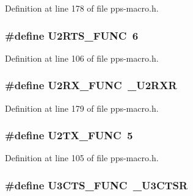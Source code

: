 Definition at line 178 of file pps-\/macro.\+h.

\hypertarget{pps-macro_8h_ad38ab81c0344617b73a0e7da86bec66b}{}
\subsubsection[{U2\+R\+T\+S\+\_\+\+F\+U\+N\+C}]{\setlength{\rightskip}{0pt plus 5cm}\#define U2\+R\+T\+S\+\_\+\+F\+U\+N\+C~6}\label{pps-macro_8h_ad38ab81c0344617b73a0e7da86bec66b}


Definition at line 106 of file pps-\/macro.\+h.

\hypertarget{pps-macro_8h_adcda8db9522945bb7767efa2d742e797}{}
\subsubsection[{U2\+R\+X\+\_\+\+F\+U\+N\+C}]{\setlength{\rightskip}{0pt plus 5cm}\#define U2\+R\+X\+\_\+\+F\+U\+N\+C~\+\_\+\+U2\+R\+X\+R}\label{pps-macro_8h_adcda8db9522945bb7767efa2d742e797}


Definition at line 179 of file pps-\/macro.\+h.

\hypertarget{pps-macro_8h_aedfc30fea10a244d35e993a18270aae5}{}
\subsubsection[{U2\+T\+X\+\_\+\+F\+U\+N\+C}]{\setlength{\rightskip}{0pt plus 5cm}\#define U2\+T\+X\+\_\+\+F\+U\+N\+C~5}\label{pps-macro_8h_aedfc30fea10a244d35e993a18270aae5}


Definition at line 105 of file pps-\/macro.\+h.

\hypertarget{pps-macro_8h_aa84e43b73aa992cf05e8a434cc0c0a59}{}
\subsubsection[{U3\+C\+T\+S\+\_\+\+F\+U\+N\+C}]{\setlength{\rightskip}{0pt plus 5cm}\#define U3\+C\+T\+S\+\_\+\+F\+U\+N\+C~\+\_\+\+U3\+C\+T\+S\+R}\label{pps-macro_8h_aa84e43b73aa992cf05e8a434cc0c0a59}


